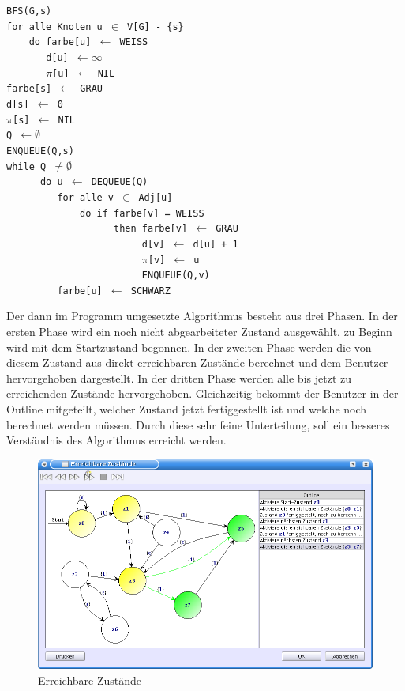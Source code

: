 \newpage
\noindent
\verb|BFS(G,s)|\\
\verb|for alle Knoten u |$\in$\verb| V[G] - {s}|\\
\verb|    do farbe[u] |$\gets$\verb| WEISS|\\
\verb|       d[u] |$\gets \infty$\\
\verb|       |$\pi$\verb|[u] |$\gets$\verb| NIL|\\
\verb|farbe[s] |$\gets$\verb| GRAU|\\
\verb|d[s] |$\gets$\verb| 0|\\
\verb||$\pi$\verb|[s] |$\gets$\verb| NIL|\\
\verb|Q |$\gets \emptyset$\\
\verb|ENQUEUE(Q,s)|\\
\verb|while Q |$\neq \emptyset$\\
\verb|      do u |$\gets$\verb| DEQUEUE(Q)|\\
\verb|         for alle v |$\in$\verb| Adj[u]|\\
\verb|             do if farbe[v] = WEISS|\\
\verb|                   then farbe[v] |$\gets$\verb| GRAU|\\
\verb|                        d[v] |$\gets$\verb| d[u] + 1|\\
\verb|                        |$\pi$\verb|[v] |$\gets$\verb| u|\\
\verb|                        ENQUEUE(Q,v)|\\
\verb|         farbe[u] |$\gets$\verb| SCHWARZ|\\
\vspace{10pt}

Der dann im Programm umgesetzte Algorithmus besteht aus drei Phasen. In der
ersten Phase wird ein noch nicht abgearbeiteter Zustand ausgewählt, zu Beginn
wird mit dem Startzustand begonnen. In der zweiten Phase werden die von diesem
Zustand aus direkt erreichbaren Zustände berechnet und dem Benutzer hervorgehoben
dargestellt. In der dritten Phase werden alle bis jetzt zu erreichenden Zustände
hervorgehoben. Gleichzeitig bekommt der Benutzer in der Outline mitgeteilt,
welcher Zustand jetzt fertiggestellt ist und welche noch berechnet werden müssen.
Durch diese sehr feine Unterteilung, soll ein besseres Verständnis des
Algorithmus erreicht werden.

\begin{figure}[h!]
\begin{center}
\includegraphics[width=12cm]{../images/reachable_states.png}
\caption{Erreichbare Zustände}
\end{center}
\end{figure}
